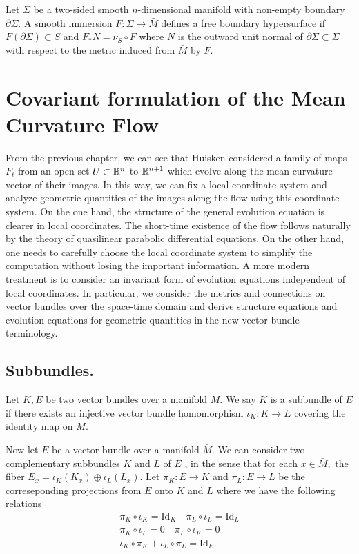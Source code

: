 Let $\Sigma $ be a two-sided smooth $n$-dimensional manifold with non-empty boundary $\partial \Sigma $. A smooth immersion $F : \Sigma \to  \bar{M}$ defines a free boundary hypersurface if $F(\partial \Sigma ) \subset S$ and $F_* N = \nu _S \circ F$ where $N$ is the outward unit normal of $\partial \Sigma \subset \Sigma $ with respect to the metric induced from $\bar{M}$ by $F$.




\section{Covariant formulation of the Mean Curvature Flow}

From the previous chapter, we can see that Huisken considered a family of maps $F_t$ from an open set $U \subset \mathbb{R}^n$ to $\mathbb{R}^{n+1}$ which evolve along the mean curvature vector of their images. In this way, we can fix a local coordinate system and analyze geometric quantities of the images along the flow using this coordinate system. On the one hand, the structure of the general evolution equation is clearer in local coordinates. The short-time existence of the flow follows naturally by the theory of quasilinear parabolic differential equations. On the other hand, one needs to carefully choose the local coordinate system to simplify the computation without losing the important information. A more modern treatment is to consider an invariant form of evolution equations independent of local coordinates. In particular, we consider the metrics and connections on vector bundles over the space-time domain and derive structure equations and evolution equations for geometric quantities in the new vector bundle terminology.

\subsection{Subbundles.}

\begin{definition}
    Let $K, E$ be two vector bundles over a manifold $\bar{M}$. We say $K$ is a subbundle of $E$ if there exists an injective vector bundle homomorphism $\iota_K : K \to E$ covering the identity map on $\bar{M}$.
\end{definition}

Now let $E$ be a vector bundle over a manifold $\bar{M}$. We can consider two complementary subbundles $K$ and $L$ of $E$ , in the sense that for each $x \in \bar{M},$ the fiber $E_x=\iota_K(K_x) \oplus \iota_L(L_x)$. Let $\pi _K : E \to K$ and $\pi _L : E \to L$ be the correseponding projections from $E$ onto $K$ and $L$ where we have the following relations
\begin{gather*}
    \pi _K \circ \iota _K= \mathrm{Id}_K \quad \pi _L \circ \iota _L=\mathrm{Id}_L\\
    \pi _K \circ \iota _L=0 \quad \pi _L \circ \iota _K=0\\
    \iota _K \circ \pi _K + \iota _L \circ \pi _L = \mathrm{Id}_E.
\end{gather*}

